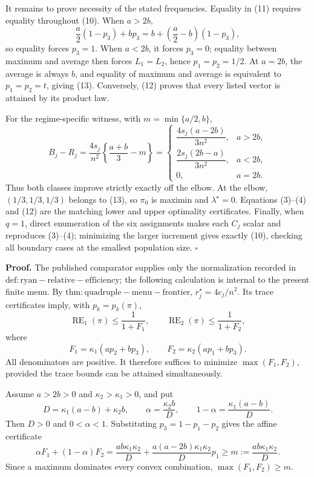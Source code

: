 It remains to prove necessity of the stated frequencies.  Equality in (11) requires equality throughout (10).  When \(a>2b\),
\[
\frac a2(1-p_3)+bp_3
=b+\left(\frac a2-b\right)(1-p_3),
\]
so equality forces \(p_3=1\).  When \(a<2b\), it forces \(p_3=0\); equality between maximum and average then forces \(L_1=L_2\), hence \(p_1=p_2=1/2\).  At \(a=2b\), the average is always \(b\), and equality of maximum and average is equivalent to \(p_1=p_2=t\), giving (13).  Conversely, (12) proves that every listed vector is attained by its product law.

For the regime-specific witness, with \(m=\min\{a/2,b\}\),
\[
B_j-R_j
=\frac{4s_j}{n^2}\left\{\frac{a+b}{3}-m\right\}
=\begin{cases}
\dfrac{4s_j(a-2b)}{3n^2},&a>2b,\\[6pt]
\dfrac{2s_j(2b-a)}{3n^2},&a<2b,\\[6pt]
0,&a=2b.
\end{cases} \tag{14}
\]
Thus both classes improve strictly exactly off the elbow.  At the elbow, \((1/3,1/3,1/3)\) belongs to (13), so \(\pi_0\) is maximin and \(\lambda^\star=0\).  Equations (3)--(4) and (12) are the matching lower and upper optimality certificates.  Finally, when \(q=1\), direct enumeration of the six assignments makes each \(C_j\) scalar and reproduces (3)--(4); minimizing the larger increment gives exactly (10), checking all boundary cases at the smallest population size. \(\square\)

\textbf{Proof.}
The published comparator supplies only the normalization recorded in \(\mathrm{def:ryan-relative-efficiency}\); the following calculation is internal to the present finite menu.  By \(\mathrm{thm:quadruple-menu-frontier}\), \(r_j^\star=4c_j/n^2\).  Its trace certificates imply, with \(p_k=p_k(\pi)\),
\[
\operatorname{RE}_1(\pi)\le\frac1{1+F_1},
\qquad
\operatorname{RE}_2(\pi)\le\frac1{1+F_2}, \tag{1}
\]
where
\[
F_1=\kappa_1(ap_2+bp_3),
\qquad F_2=\kappa_2(ap_1+bp_3). \tag{2}
\]
All denominators are positive.  It therefore suffices to minimize \(\max(F_1,F_2)\), provided the trace bounds can be attained simultaneously.

Assume \(a>2b>0\) and \(\kappa_2>\kappa_1>0\), and put
\[
D=\kappa_1(a-b)+\kappa_2b,
\qquad
\alpha=\frac{\kappa_2b}{D},
\qquad
1-\alpha=\frac{\kappa_1(a-b)}D. \tag{3}
\]
Then \(D>0\) and \(0<\alpha<1\).  Substituting \(p_3=1-p_1-p_2\) gives the affine certificate
\[
\alpha F_1+(1-\alpha)F_2
=\frac{ab\kappa_1\kappa_2}{D}
+\frac{a(a-2b)\kappa_1\kappa_2}{D}p_1
\ge m:=\frac{ab\kappa_1\kappa_2}{D}. \tag{4}
\]
Since a maximum dominates every convex combination, \(\max(F_1,F_2)\ge m\).

